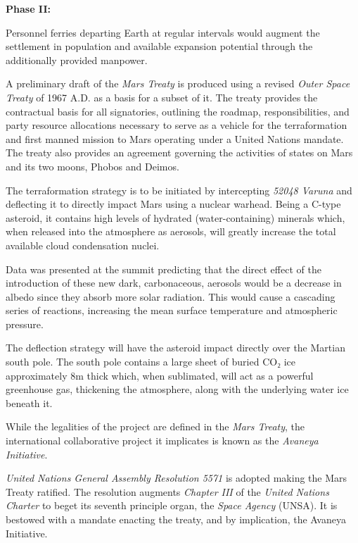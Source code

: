 {\bf Phase II:}

\startitemize[n]
\item Personnel ferries departing Earth at regular intervals would augment the settlement in population and available expansion potential through the additionally provided manpower.
\stopitemize

A preliminary draft of the {\it Mars Treaty} is produced using a revised {\it Outer Space Treaty} of 1967 A.D. as a basis for a subset of it. The treaty provides the contractual basis for all signatories, outlining the roadmap, responsibilities, and party resource allocations necessary to serve as a vehicle for the terraformation and first manned mission to Mars operating under a United Nations mandate. The treaty also provides an agreement governing the activities of states on Mars and its two moons, Phobos and Deimos.

The terraformation strategy is to be initiated by intercepting {\it 52048 Varuna} and deflecting it to directly impact Mars using a nuclear warhead. Being a C-type asteroid, it contains high levels of hydrated (water-containing) minerals which, when released into the atmosphere as aerosols, will greatly increase the total available cloud condensation nuclei. 

Data was presented at the summit predicting that the direct effect of the introduction of these new dark, carbonaceous, aerosols would be a decrease in albedo since they absorb more solar radiation. This would cause a cascading series of reactions, increasing the mean surface temperature and atmospheric pressure.

The deflection strategy will have the asteroid impact directly over the Martian south pole. The south pole contains a large sheet of buried CO₂ ice approximately 8m thick which, when sublimated, will act as a powerful greenhouse gas, thickening the atmosphere, along with the underlying water ice beneath it.

While the legalities of the project are defined in the {\it Mars Treaty}, the international collaborative project it implicates is known as the {\it Avaneya Initiative}.
\StopTimelineDate

{\it United Nations General Assembly Resolution 5571} is adopted making the Mars Treaty ratified. The resolution augments {\it Chapter III} of the {\it United Nations Charter} to beget its seventh principle organ, the {\it Space Agency} (UNSA). It is bestowed with a mandate enacting the treaty, and by implication, the Avaneya Initiative.

